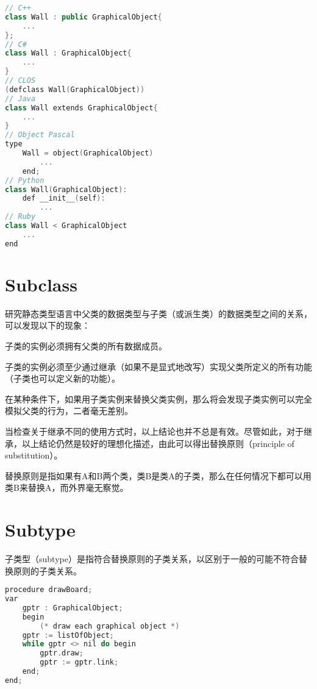 \begin{lstlisting}[language=C++]
// C++
class Wall : public GraphicalObject{
	...
};
// C#
class Wall : GraphicalObject{
	...
}
// CLOS
(defclass Wall(GraphicalObject))
// Java
class Wall extends GraphicalObject{
	...
}
// Object Pascal
type
	Wall = object(GraphicalObject)
		...
	end;
// Python
class Wall(GraphicalObject):
	def __init__(self):
		...
// Ruby
class Wall < GraphicalObject
	...
end
\end{lstlisting}


\chapter{Subclass}

研究静态类型语言中父类的数据类型与子类（或派生类）的数据类型之间的关系，可以发现以下的现象：

\begin{compactitem}
\item 子类的实例必须拥有父类的所有数据成员。
\item 子类的实例必须至少通过继承（如果不是显式地改写）实现父类所定义的所有功能（子类也可以定义新的功能）。
\item 在某种条件下，如果用子类实例来替换父类实例，那么将会发现子类实例可以完全模拟父类的行为，二者毫无差别。
\end{compactitem}

当检查关于继承不同的使用方式时，以上结论也并不总是有效。尽管如此，对于继承，以上结论仍然是较好的理想化描述，由此可以得出替换原则（principle of substitution）。

\begin{oopquote}
替换原则是指如果有A和B两个类，类B是类A的子类，那么在任何情况下都可以用类B来替换A，而外界毫无察觉。
\end{oopquote}

\chapter{Subtype}

子类型（subtype）是指符合替换原则的子类关系，以区别于一般的可能不符合替换原则的子类关系。



\begin{lstlisting}[language=C++]
procedure drawBoard;
var
	gptr : GraphicalObject;
	begin
		(* draw each graphical object *)
	gptr := listOfObject;
	while gptr <> nil do begin
		gptr.draw;
		gptr := gptr.link;
	end;
end;
\end{lstlisting}

